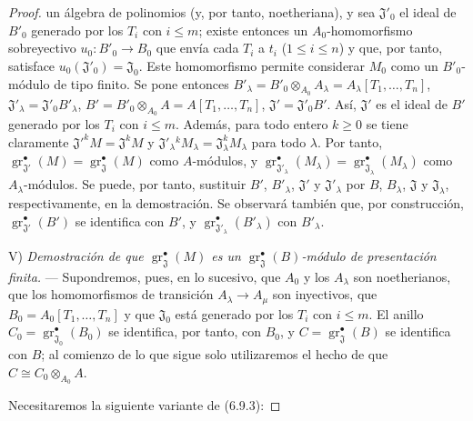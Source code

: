 \begin{proof}
un álgebra de polinomios (y, por tanto, noetheriana), y sea $\mathfrak J'_0$ el ideal de $B'_0$ generado por los $T_i$ con $i\leq m$; existe entonces un $A_0$-homomorfismo sobreyectivo $u_0:B'_0\to B_0$ que envía cada $T_i$ a $t_i$ ($1\leq i\leq n$) y que, por tanto, satisface $u_0(\mathfrak J'_0)=\mathfrak J_0$. Este homomorfismo permite considerar $M_0$ como un $B'_0$-módulo de tipo finito. Se pone entonces
$B'_\lambda=B'_0\otimes_{A_0}A_\lambda
=A_\lambda[T_1,\ldots,T_n]$, $\mathfrak J'_\lambda=\mathfrak J'_0B'_\lambda$,
$B'=B'_0\otimes_{A_0}A=A[T_1,\ldots,T_n]$, $\mathfrak J'=\mathfrak J'_0B'$.
Así, $\mathfrak J'$ es el ideal de $B'$ generado por los $T_i$ con $i\leq m$. Además, para todo entero $k\geq0$ se tiene claramente
$\mathfrak J'^kM=\mathfrak J^kM$ y
$\mathfrak J'_\lambda{}^kM_\lambda=\mathfrak J_\lambda^kM_\lambda$
para todo $\lambda$. Por tanto,
$\operatorname{gr}_{\mathfrak J'}^\bullet(M)=\operatorname{gr}_{\mathfrak J}^\bullet(M)$
como $A$-módulos, y
$\operatorname{gr}_{\mathfrak J'_\lambda}^\bullet(M_\lambda)
=\operatorname{gr}_{\mathfrak J_\lambda}^\bullet(M_\lambda)$
como $A_\lambda$-módulos. Se puede, por tanto, sustituir $B'$, $B'_\lambda$, $\mathfrak J'$ y $\mathfrak J'_\lambda$ por $B$, $B_\lambda$, $\mathfrak J$ y $\mathfrak J_\lambda$, respectivamente, en la demostración. Se observará también que, por construcción, $\operatorname{gr}_{\mathfrak J'}^\bullet(B')$ se identifica con $B'$, y $\operatorname{gr}_{\mathfrak J'_\lambda}^\bullet(B'_\lambda)$ con $B'_\lambda$.

\medskip
\noindent V) \emph{Demostración de que $\operatorname{gr}_{\mathfrak J}^\bullet(M)$ es un $\operatorname{gr}_{\mathfrak J}^\bullet(B)$-módulo de presentación finita.} --- Supondremos, pues, en lo sucesivo, que $A_0$ y los $A_\lambda$ son noetherianos, que los homomorfismos de transición $A_\lambda\to A_\mu$ son inyectivos, que $B_0=A_0[T_1,\ldots,T_n]$ y que $\mathfrak J_0$ está generado por los $T_i$ con $i\leq m$. El anillo $C_0=\operatorname{gr}_{\mathfrak J_0}^\bullet(B_0)$ se identifica, por tanto, con $B_0$, y $C=\operatorname{gr}_{\mathfrak J}^\bullet(B)$ se identifica con $B$; al comienzo de lo que sigue solo utilizaremos el hecho de que $C\cong C_0\otimes_{A_0}A$.

Necesitaremos la siguiente variante de (6.9.3):


\end{proof}
